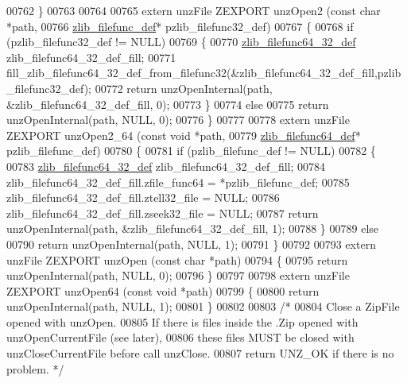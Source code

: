 \begin{DoxyCode}
00762 \}
00763 
00764 
00765 \textcolor{keyword}{extern} unzFile ZEXPORT unzOpen2 (\textcolor{keyword}{const} \textcolor{keywordtype}{char} *path,
00766                                         \hyperlink{structzlib__filefunc__def__s}{zlib\_filefunc\_def}* pzlib\_filefunc32\_def)
00767 \{
00768     \textcolor{keywordflow}{if} (pzlib\_filefunc32\_def != NULL)
00769     \{
00770         \hyperlink{structzlib__filefunc64__32__def__s}{zlib\_filefunc64\_32\_def} zlib\_filefunc64\_32\_def\_fill;
00771         fill\_zlib\_filefunc64\_32\_def\_from\_filefunc32(&zlib\_filefunc64\_32\_def\_fill,pzlib\_filefunc32\_def);
00772         \textcolor{keywordflow}{return} unzOpenInternal(path, &zlib\_filefunc64\_32\_def\_fill, 0);
00773     \}
00774     \textcolor{keywordflow}{else}
00775         \textcolor{keywordflow}{return} unzOpenInternal(path, NULL, 0);
00776 \}
00777 
00778 \textcolor{keyword}{extern} unzFile ZEXPORT unzOpen2\_64 (\textcolor{keyword}{const} \textcolor{keywordtype}{void} *path,
00779                                      \hyperlink{structzlib__filefunc64__def__s}{zlib\_filefunc64\_def}* pzlib\_filefunc\_def)
00780 \{
00781     \textcolor{keywordflow}{if} (pzlib\_filefunc\_def != NULL)
00782     \{
00783         \hyperlink{structzlib__filefunc64__32__def__s}{zlib\_filefunc64\_32\_def} zlib\_filefunc64\_32\_def\_fill;
00784         zlib\_filefunc64\_32\_def\_fill.zfile\_func64 = *pzlib\_filefunc\_def;
00785         zlib\_filefunc64\_32\_def\_fill.ztell32\_file = NULL;
00786         zlib\_filefunc64\_32\_def\_fill.zseek32\_file = NULL;
00787         \textcolor{keywordflow}{return} unzOpenInternal(path, &zlib\_filefunc64\_32\_def\_fill, 1);
00788     \}
00789     \textcolor{keywordflow}{else}
00790         \textcolor{keywordflow}{return} unzOpenInternal(path, NULL, 1);
00791 \}
00792 
00793 \textcolor{keyword}{extern} unzFile ZEXPORT unzOpen (\textcolor{keyword}{const} \textcolor{keywordtype}{char} *path)
00794 \{
00795     \textcolor{keywordflow}{return} unzOpenInternal(path, NULL, 0);
00796 \}
00797 
00798 \textcolor{keyword}{extern} unzFile ZEXPORT unzOpen64 (\textcolor{keyword}{const} \textcolor{keywordtype}{void} *path)
00799 \{
00800     \textcolor{keywordflow}{return} unzOpenInternal(path, NULL, 1);
00801 \}
00802 
00803 \textcolor{comment}{/*}
00804 \textcolor{comment}{  Close a ZipFile opened with unzOpen.}
00805 \textcolor{comment}{  If there is files inside the .Zip opened with unzOpenCurrentFile (see later),}
00806 \textcolor{comment}{    these files MUST be closed with unzCloseCurrentFile before call unzClose.}
00807 \textcolor{comment}{  return UNZ\_OK if there is no problem. */}

\end{DoxyCode}
